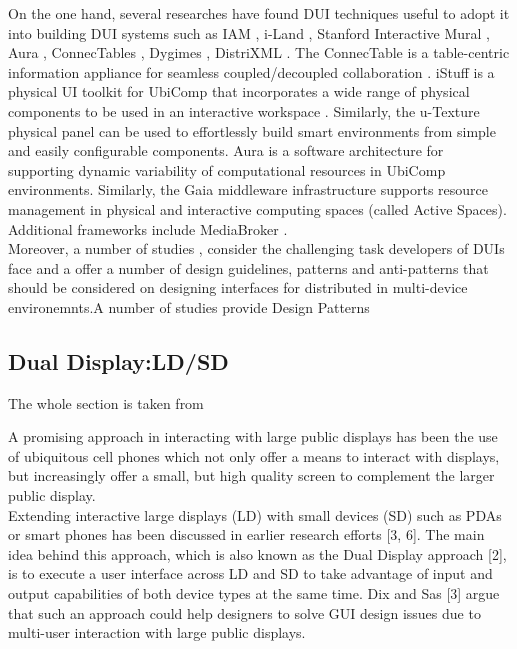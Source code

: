 On the one hand, several researches have found DUI
techniques useful to adopt it into building DUI systems such as IAM
\cite{coutaz2003software}, i-Land \cite{streitz1999land}, Stanford Interactive
Mural \cite{guimbretiere2001fluid}, Aura \cite{sousa2002aura}, ConnecTables
\cite{tandler2001connectables} , Dygimes \cite{vandervelpen2004towards},
DistriXML \cite{grolaux2004migratable}. The ConnecTable is a table-centric
information appliance for seamless coupled/decoupled collaboration
\cite{tandler2001connectables}. iStuff is a physical UI toolkit for UbiComp that
incorporates a wide range of physical components to be used in an interactive
workspace \cite{ballagas2003istuff}. Similarly, the u-Texture \cite{kohtake2005u}
physical panel can be used to effortlessly build smart environments from simple
and easily configurable components. Aura \cite{sousa2002aura} is a software architecture for supporting dynamic variability of computational resources in UbiComp environments.
Similarly, the Gaia \cite{roman2002middleware} middleware infrastructure supports resource
management in physical and interactive computing spaces (called Active Spaces). Additional
frameworks include MediaBroker \cite{modahl2004mediabroker}.\\

Moreover, a number of studies \cite{seifried2011lessons},
\cite{vanderdonckt2010distributed} consider the challenging task developers of
DUIs face and a offer a number of design guidelines, patterns and anti-patterns that should be considered on designing interfaces for distributed in multi-device environemnts.A number of studies provide Design Patterns\\

\subsection{Dual Display:LD/SD}
The whole section is taken from \cite{kaviani2011dual}

A promising approach in interacting with large public displays has been the use
of ubiquitous cell phones which not only offer a means to interact with
displays, but increasingly offer a small, but high quality screen to complement
the larger public display.\\

Extending interactive large displays (LD) with small devices (SD) such as PDAs
or smart phones has been discussed in earlier research efforts [3, 6]. The main
idea behind this approach, which is also known as the Dual Display approach [2],
is to execute a user interface across LD and SD to take advantage of input and
output capabilities of both device types at the same time. Dix and Sas [3] argue
that such an approach could help designers to solve GUI design issues due to multi-user interaction with large public displays.\\

